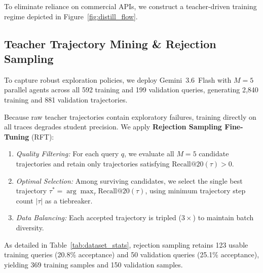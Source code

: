 \documentclass[11pt]{article}
\begin{document}
To eliminate reliance on commercial APIs, we construct a teacher-driven training regime depicted in Figure~\ref{fig:distill_flow}.

\subsection{Teacher Trajectory Mining \& Rejection Sampling}
To capture robust exploration policies, we deploy Gemini~3.6~Flash with $M=5$ parallel agents across all 592 training and 199 validation queries, generating 2,840 training and 881 validation trajectories.

Because raw teacher trajectories contain exploratory failures, training directly on all traces degrades student precision. We apply \textbf{Rejection Sampling Fine-Tuning} (RFT):
\begin{enumerate}[leftmargin=*]
    \item \textit{Quality Filtering:} For each query $q$, we evaluate all $M=5$ candidate trajectories and retain only trajectories satisfying $\text{Recall@20}(\tau) > 0$.
    \item \textit{Optimal Selection:} Among surviving candidates, we select the single best trajectory $\tau^* = \arg\max_\tau \text{Recall@20}(\tau)$, using minimum trajectory step count $|\tau|$ as a tiebreaker.
    \item \textit{Data Balancing:} Each accepted trajectory is tripled ($3\times$) to maintain batch diversity.
\end{enumerate}
As detailed in Table~\ref{tab:dataset_stats}, rejection sampling retains 123 usable training queries (20.8\% acceptance) and 50 validation queries (25.1\% acceptance), yielding 369 training samples and 150 validation samples.

\begin{table}[t]
\centering
\small
{}
\caption{Trajectory dataset statistics before and after Rejection Sampling filtering on STaRK-PrimeKG.}
\label{tab:dataset_stats}
\end{table}
\end{document}
